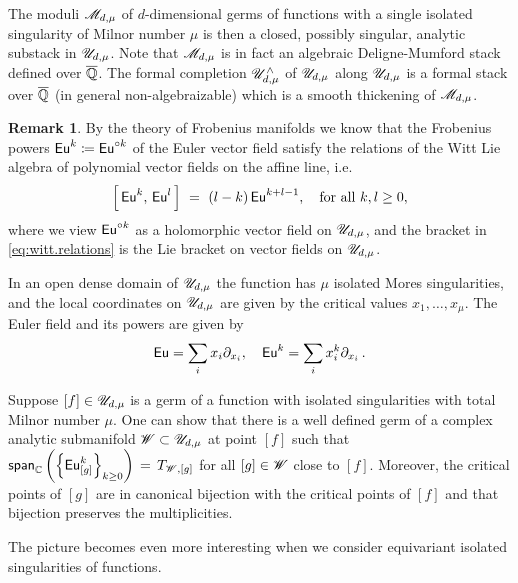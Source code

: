 \documentclass[twoside,leqno]{article}
\numberwithin{equation}{section}
\theoremstyle{plain}
\theoremstyle{definition}
\newtheorem{remark}[equation]{Remark}
\begin{document}
\medskip

The moduli $\mathscr{M}_{d,\mu}$ of $d$-dimensional  germs of functions  with a single isolated singularity of Milnor number $\mu$ is then a closed, possibly singular, analytic substack in 
$\mathscr{U}_{d,\mu}$. Note that $\mathscr{M}_{d,\mu}$ is in fact an algebraic Deligne-Mumford stack defined over $\overline{\mathbb Q}$. The formal completion $\mathscr{U}_{d,\mu}^{\wedge}$  of 
$\mathscr{U}_{d,\mu}$ along $\mathscr{U}_{d,\mu}$ is a formal stack over $\overline{\mathbb Q}$ (in general non-algebraizable) which is a smooth thickening of $\mathscr{M}_{d,\mu}$.

\begin{remark} \label{rem:witt.move} 
By the theory of Frobenius manifolds \cite{Manin_Frobenius_manifolds} we know that the Frobenius powers $\operatorname{\mathsf{Eu}}^{k} \coloneqq \operatorname{\mathsf{Eu}}^{\circ k}$ of the Euler vector field satisfy the relations of the Witt Lie algebra of polynomial vector fields on the affine line, i.e.\ 
\begin{equation} \label{eq:witt.relations}
\left[\, \operatorname{\mathsf{Eu}}^{k}, \, \operatorname{\mathsf{Eu}}^{l}\,\right] \ = \ (l-k) \operatorname{\mathsf{Eu}}^{k+l-1}, \quad \text{for all} \ k, l \geq 0,
\end{equation}
where we view $\operatorname{\mathsf{Eu}}^{\circ k}$ as a holomorphic vector field on 
$\mathscr{U}_{d,\mu}$, and the bracket in \eqref{eq:witt.relations} is the Lie bracket on vector fields on $\mathscr{U}_{d,\mu}$. 

In an open dense domain of $\mathscr{U}_{d,\mu}$ the function has $\mu$ isolated Mores singularities, and the local coordinates on $\mathscr{U}_{d,\mu}$ are given by the critical values $x_1,\dots,x_\mu$. The Euler field and its powers are given by
$$ \operatorname{\mathsf{Eu}}=\sum_i x_i\partial_{x_i},\quad \operatorname{\mathsf{Eu}}^k=\sum_i x_i^k\partial_{x_i}\,.$$

Suppose $[f] \in \mathscr{U}_{d,\mu}$ is a germ of a function with isolated singularities with   total Milnor number $\mu$. One can show that there is a well defined germ of a complex analytic submanifold
$\mathscr{W} \subset \mathscr{U}_{d,\mu}$ at point $[f]$ such that $\mathsf{span}_{\mathbb C}\left(\left\{\operatorname{\mathsf{Eu}}^{k}_{[g]}\right\}_{k \geq 0}\right) \, = \, T_{\mathscr{W},[g]}$ for all $[g]\in \mathscr{W}$ close to $[f]$. 
Moreover, the  critical points of $[g]$ are in canonical bijection with the critical points of 
$[f]$ and that bijection preserves the multiplicities. 
\end{remark}

The picture becomes even more interesting when we consider equivariant isolated singularities of functions. 
\end{document}

